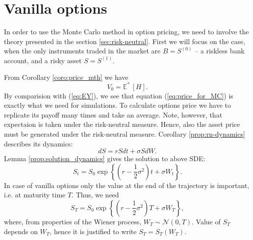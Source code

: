 \documentclass[a4paper,11pt, twoside]{book}
\theoremstyle{definition}
\theoremstyle{remark}
\def\Em{{\mathbb{E}^*}\,}
\begin{document}
\section{Vanilla options}
\label{sec:pricing_vanilla}

In order to use the Monte Carlo method in option pricing, we need to involve the theory presented in the section \ref{sec:risk-neutral}. First we will focus on the case, when the only instruments traded in the market are $B = S^{(0)}$ -- a riskless bank account, and a risky asset $S = S^{(1)}$.

From Corollary \ref{coro:price_mth} we have
\begin{equation}
 \label{eq:price_for_MC}
 V_0 = \Em[H].%
\end{equation}
By comparision with (\ref{eq:EY}), we see that equation (\ref{eq:price_for_MC}) is exactly what we need for simulations. To calculate options price we have to replicate its payoff many times and take an average. Note, however, that expectaion is taken under the risk-neutral measure. Hence, also the asset price must be generated under the risk-neutral measure. Corollary \ref{prop:rn-dynamics} describes its dynamics:
\[ dS = rSdt + \sigma S dW. \]
Lemma \ref{prop:solution_dynamics} gives the solution to above SDE:
\begin{equation}
 \label{eq:vanilla_St}
 S_t = S_0 \exp\left\{ (r - \frac{1}{2}\sigma^2)t + \sigma W_t \right\}.
\end{equation}
In case of vanilla options only the value at the end of the trajectory is important, i.e. at maturity time $T$. Thus, we need
\begin{equation}
\label{eq:vanilla_ST}
 S_T = S_0 \exp\left\{ (r - \frac{1}{2}\sigma^2)T + \sigma W_T \right\},
\end{equation}
where, from properties of the Wiener process, $W_T \sim \mathcal{N}(0,T)$. Value of $S_T$ depends on $W_T$, hence it is justified to write $S_T = S_T(W_T)$.
\end{document}
